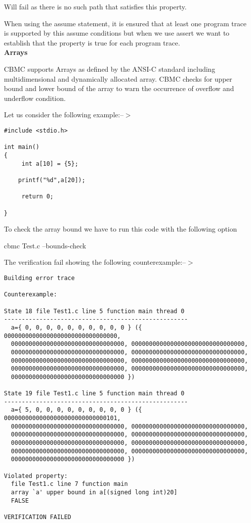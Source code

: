 Will fail as there is no such path that satisfies this property.

When using the assume statement, it is ensured that at least one program trace 
is supported by this assume conditions but when we use assert we want to establish
that the property is true for each program trace. \\
 
\textbf{Arrays}
 
CBMC supports Arrays as defined by the ANSI-C standard including multidimensional
and dynamically allocated array. CBMC checks for upper bound and lower bound of
the array to warn the occurrence of overflow and underflow condition.
 
Let us consider the following example:--$>$
\begin{verbatim}
#include <stdio.h>

int main()
{
     int a[10] = {5};

    printf("%d",a[20]);

     return 0;

}
\end{verbatim}
To check the array bound we have to run this code with the following option

cbmc Test.c --bounds-check

The verification fail showing the following counterexample:--$>$
\begin{verbatim}
Building error trace

Counterexample:

State 18 file Test1.c line 5 function main thread 0
----------------------------------------------------
  a={ 0, 0, 0, 0, 0, 0, 0, 0, 0, 0 } ({ 00000000000000000000000000000000, 
  00000000000000000000000000000000, 00000000000000000000000000000000, 
  00000000000000000000000000000000, 00000000000000000000000000000000, 
  00000000000000000000000000000000, 00000000000000000000000000000000, 
  00000000000000000000000000000000, 00000000000000000000000000000000, 
  00000000000000000000000000000000 })

State 19 file Test1.c line 5 function main thread 0
----------------------------------------------------
  a={ 5, 0, 0, 0, 0, 0, 0, 0, 0, 0 } ({ 00000000000000000000000000000101, 
  00000000000000000000000000000000, 00000000000000000000000000000000, 
  00000000000000000000000000000000, 00000000000000000000000000000000, 
  00000000000000000000000000000000, 00000000000000000000000000000000, 
  00000000000000000000000000000000, 00000000000000000000000000000000, 
  00000000000000000000000000000000 })

Violated property:
  file Test1.c line 7 function main
  array `a' upper bound in a[(signed long int)20]
  FALSE

VERIFICATION FAILED

\end{verbatim}

